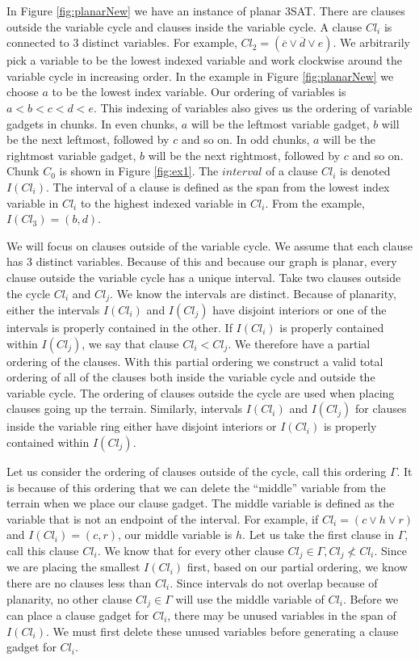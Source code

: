 \documentclass[11pt]{article}
\begin{document}
In Figure \ref{fig:planarNew} we have an instance of planar 3SAT.  There are clauses outside the variable cycle and clauses inside the variable cycle.  A clause $Cl_i$ is connected to 3 distinct variables.  For example, $Cl_2 = (\overline{c} \vee \overline{d} \vee e)$.  We arbitrarily pick a variable to be the lowest indexed variable and work clockwise around the variable cycle in increasing order.  In the example in Figure \ref{fig:planarNew} we choose $a$ to be the lowest index variable.  Our ordering of variables is $a<b<c<d<e$.  This indexing of variables also gives us the ordering of variable gadgets in chunks.  In even chunks, $a$ will be the leftmost variable gadget, $b$ will be the next leftmost, followed by $c$ and so on.  In odd chunks, $a$ will be the rightmost variable gadget, $b$ will be the next rightmost, followed by $c$ and so on.  Chunk $C_0$ is shown in Figure \ref{fig:ex1}.  The $interval$ of a clause $Cl_i$ is denoted $I(Cl_i)$.  The interval of a clause is defined as the span from the lowest index variable in $Cl_i$ to the highest indexed variable in $Cl_i$.  From the example, $I(Cl_3) = (b,d)$.  

We will focus on clauses outside of the variable cycle.  We assume that each clause has $3$ distinct variables.  Because of this and because our graph is planar, every clause outside the variable cycle has a unique interval.  Take two clauses outside the cycle $Cl_i$ and $Cl_j$.  We know the intervals are distinct.  Because of planarity, either the intervals $I(Cl_i)$ and $I(Cl_j)$ have disjoint interiors or one of the intervals is properly contained in the other.  If $I(Cl_i)$ is properly contained within $I(Cl_j)$, we say that clause $Cl_i < Cl_j$.  We therefore have a partial ordering of the clauses.  With this partial ordering we construct a valid total ordering of all of the clauses both inside the variable cycle and outside the variable cycle.  The ordering of clauses outside the cycle are used when placing clauses going up the terrain.  Similarly, intervals $I(Cl_i)$ and $I(Cl_j)$ for clauses inside the variable ring either have disjoint interiors or $I(Cl_i)$ is properly contained within $I(Cl_j)$.

Let us consider the ordering of clauses outside of the cycle, call this ordering $\Gamma$.  It is because of this ordering that we can delete the ``middle'' variable from the terrain when we place our clause gadget.  The middle variable is defined as the variable that is not an endpoint of the interval.  For example, if $Cl_i = (c \vee h \vee r)$ and $I(Cl_i) = (c,r)$, our middle variable is $h$.  Let us take the first clause in $\Gamma$, call this clause $Cl_i$.  We know that for every other clause $Cl_j \in \Gamma, Cl_j \nless Cl_i$.  Since we are placing the smallest $I(Cl_i)$ first, based on our partial ordering, we know there are no clauses less than $Cl_i$.  Since intervals do not overlap because of planarity, no other clause $Cl_j \in \Gamma$ will use the middle variable of $Cl_i$.  Before we can place a clause gadget for $Cl_i$, there may be unused variables in the span of $I(Cl_i)$.  We must first delete these unused variables before generating a clause gadget for $Cl_i$.
\end{document}
